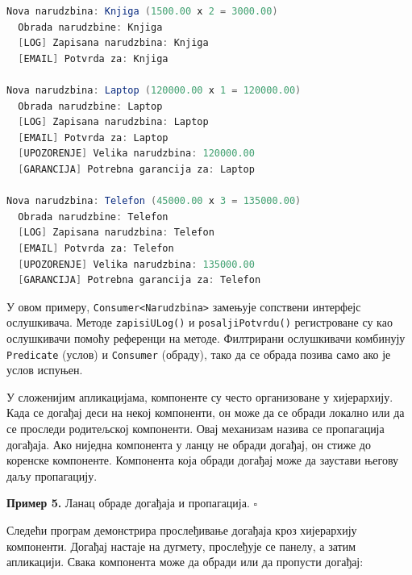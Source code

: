 \begin{lstlisting}[language=Java]
Nova narudzbina: Knjiga (1500.00 x 2 = 3000.00)
  Obrada narudzbine: Knjiga
  [LOG] Zapisana narudzbina: Knjiga
  [EMAIL] Potvrda za: Knjiga
 
Nova narudzbina: Laptop (120000.00 x 1 = 120000.00)
  Obrada narudzbine: Laptop
  [LOG] Zapisana narudzbina: Laptop
  [EMAIL] Potvrda za: Laptop
  [UPOZORENJE] Velika narudzbina: 120000.00
  [GARANCIJA] Potrebna garancija za: Laptop
 
Nova narudzbina: Telefon (45000.00 x 3 = 135000.00)
  Obrada narudzbine: Telefon
  [LOG] Zapisana narudzbina: Telefon
  [EMAIL] Potvrda za: Telefon
  [UPOZORENJE] Velika narudzbina: 135000.00
  [GARANCIJA] Potrebna garancija za: Telefon
\end{lstlisting}


У овом примеру, \texttt{Consumer\textless{}Narudzbina\textgreater{}} замењује сопствени интерфејс ослушкивача. Методе \texttt{zapisiULog()} и \texttt{posaljiPotvrdu()} регистроване су као ослушкивачи помоћу референци на методе. Филтрирани ослушкивачи комбинују \texttt{Predicate} (услов) и \texttt{Consumer} (обраду), тако да се обрада позива само ако је услов испуњен.

У сложенијим апликацијама, компоненте су често организоване у хијерархију. Када се догађај деси на некој компоненти, он може да се обради локално или да се проследи родитељској компоненти. Овај механизам назива се пропагација догађаја. Ако ниједна компонента у ланцу не обради догађај, он стиже до коренске компоненте. Компонента која обради догађај може да заустави његову даљу пропагацију.


\bigskip

\noindent \textbf{Пример 5.} Ланац обраде догађаја и пропагација. $\square$

\medskip

Следећи програм демонстрира прослеђивање догађаја кроз хијерархију компоненти. Догађај настаје на дугмету, прослеђује се панелу, а затим апликацији. Свака компонента може да обради или да пропусти догађај:


